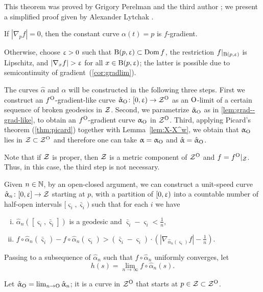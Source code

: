 This theorem was proved by Grigory Perelman and the third author \cite{perelman-petrunin:qg};
we present a simplified proof given by Alexander Lytchak \cite{lytchak:open-map}.

If $|\nabla_p f|=0$, then the constant curve $\alpha(t)=p$ is $f$-gradient.

Otherwise, choose $\upvarepsilon>0$ 
such that $\oBall(p,\eps)\subset\Dom f$,
the restriction $f|_{\mathrm{B}{}(p,\upvarepsilon)}$ is Lipschitz, 
and $|\nabla_x f|>\eps$ for all $x\in \oBall(p,\eps)$;
the latter is possible due to semicontinuity of \textbar gradient\textbar\ (\ref{cor:gradlim}).

The curves $\hat\alpha$ and $\alpha$ will be constructed in the following three steps.
First we construct an $f^{\mathrm{O}}$-gradient-like curve $\hat\alpha_\o\:[0,\eps)\to\spc{Z}^\o$ as an $\mathrm{O}$-limit of a certain sequence of broken geodesics in $\mathcal{Z}$.
Second, we parametrize $\hat{\upalpha}_{\mathrm{O}}$ as in \ref{lem:grad--grad-like}, to obtain an $f^{\mathrm{O}}$-gradient curve $\upalpha_{\mathrm{O}}$ in $\mathcal{Z}^{\mathrm{O}}$.
Third, applying Picard's theorem (\ref{thm:picard}) together with Lemma~\ref{lem:X-X^w}, we obtain that $\upalpha_{\mathrm{O}}$ lies in $\spc{Z}\subset \spc{Z}^\o$ and therefore one can take $\upalpha=\upalpha_{\mathrm{O}}$ and $\hat{\upalpha}=\hat{\upalpha}_{\mathrm{O}}$.

Note that if $\mathcal{Z}$ is proper, then $\mathcal{Z}$ is a metric component of $\mathcal{Z}^{\mathrm{O}}$ and $f=f^{\mathrm{O}}|_{\mathcal{Z}}$.
Thus, in this case, the third step is not necessary.

Given $n\in \NN$, 
by an open-closed argument,
we can construct a unit-speed curve $\hat\alpha_n\:[0,\eps] \to \spc{Z}$ starting at $p$, with a partition of $[0,\upvarepsilon)$ into a countable number of half-open intervals $[\varsigma_i,\bar\varsigma_i)$ 
such that for each $i$ we have 
\begin{enumerate}[(i)]
\item $\hat\alpha_n([\varsigma_i,\bar\varsigma_i])$ is a geodesic and $\bar\varsigma_i-\varsigma_i<\tfrac{1}{n}$,
\item\label{alm-grad} 
$f\circ\hat\alpha_n(\bar\varsigma_i)-f\circ\hat\alpha_n(\varsigma_i)
>
(\bar\varsigma_i-\varsigma_i)
\cdot
(|\nabla_{\hat\alpha_n(\varsigma_i)}f|-\tfrac{1}{n}).$
\end{enumerate}

Passing to a subsequence of $\hat\alpha_n$ such that $f\circ\hat\alpha_n$ uniformly converges, let 
\[h(s)=\lim_{n\to\infty}f\circ\hat\alpha_n(s).\]

Let $\hat\alpha_\o=\lim_{n\to\o}\hat\alpha_{n}$;
it is a curve in $\mathcal{Z}^{\mathrm{O}}$ that starts at $p\in \spc{Z}\subset \spc{Z}^\o$.

